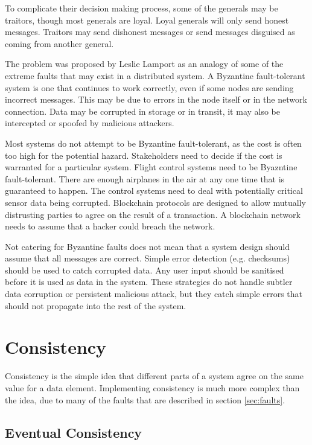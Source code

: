 To complicate their decision making process, some of the generals may be traitors,
though most generals are loyal.
Loyal generals will only send honest messages.
Traitors may send dishonest messages or send messages disguised as coming from another general.

The problem was proposed by Leslie Lamport as an analogy of some of the extreme faults that may exist in a distributed system.
A Byzantine fault-tolerant system is one that continues to work correctly, even if some nodes are sending incorrect messages.
This may be due to errors in the node itself or in the network connection.
Data may be corrupted in storage or in transit, it may also be intercepted or spoofed by malicious attackers.

Most systems do not attempt to be Byzantine fault-tolerant, as the cost is often too high for the potential hazard.
Stakeholders need to decide if the cost is warranted for a particular system.
Flight control systems need to be Byazntine fault-tolerant.
There are enough airplanes in the air at any one time that
is guaranteed to happen.
The control systems need to deal with potentially critical sensor data being corrupted.
Blockchain protocols are designed to allow mutually distrusting parties to agree on the result of a transaction.
A blockchain network needs to assume that a hacker could breach the network.

Not catering for Byzantine faults does not mean that a system design should assume that all messages are correct.
Simple error detection (e.g. checksums) should be used to catch corrupted data.
Any user input should be sanitised before it is used as data in the system.
These strategies do not handle subtler data corruption or persistent malicious attack,
but they catch simple errors that should not propagate into the rest of the system.


\section{Consistency}
Consistency is the simple idea that different parts of a system agree on the same value for a data element.
Implementing consistency is much more complex than the idea, due to many of the faults that are described in section \ref{sec:faults}.

\subsection{Eventual Consistency}

